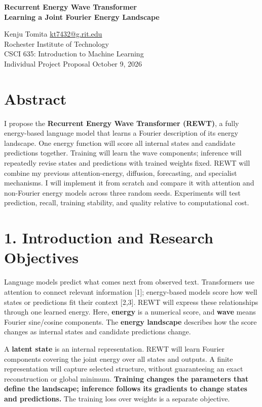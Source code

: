 \documentclass[11pt,letterpaper]{article}
\begin{document}
\begin{center}
{\Large\bfseries Recurrent Energy Wave Transformer\\Learning a Joint Fourier Energy Landscape}\par
\vspace{3pt}
Kenju Tomita \quad \href{mailto:kt7432@g.rit.edu}{kt7432@g.rit.edu}\\
Rochester Institute of Technology\\
CSCI 635: Introduction to Machine Learning\\
Individual Project Proposal \quad October 9, 2026
\end{center}

\section*{Abstract}

I propose the \textbf{Recurrent Energy Wave Transformer (REWT)}, a fully energy-based language model that learns a Fourier description of its energy landscape. One energy function will score all internal states and candidate predictions together. Training will learn the wave components; inference will repeatedly revise states and predictions with trained weights fixed. REWT will combine my previous attention-energy, diffusion, forecasting, and specialist mechanisms. I will implement it from scratch and compare it with attention and non-Fourier energy models across three random seeds. Experiments will test prediction, recall, training stability, and quality relative to computational cost.

\section*{1. Introduction and Research Objectives}

Language models predict what comes next from observed text. Transformers use attention to connect relevant information [1]; energy-based models score how well states or predictions fit their context [2,3]. REWT will express these relationships through one learned energy. Here, \textbf{energy} is a numerical score, and \textbf{wave} means Fourier sine/cosine components. The \textbf{energy landscape} describes how the score changes as internal states and candidate predictions change.

A \textbf{latent state} is an internal representation. REWT will learn Fourier components covering the joint energy over all states and outputs. A finite representation will capture selected structure, without guaranteeing an exact reconstruction or global minimum. \textbf{Training changes the parameters that define the landscape; inference follows its gradients to change states and predictions.} The training loss over weights is a separate objective.
\end{document}
